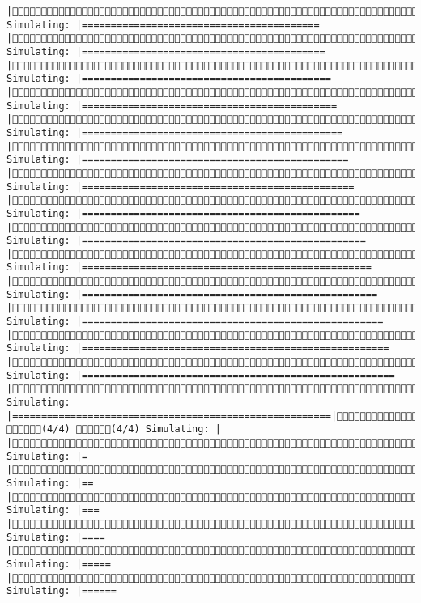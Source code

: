 \documentclass[]{article}
\begin{document}
\begin{verbatim}
|(3/4) Simulating: |=========================================              |(3/4) Simulating: |==========================================             |(3/4) Simulating: |===========================================            |(3/4) Simulating: |============================================           |(3/4) Simulating: |=============================================          |(3/4) Simulating: |==============================================         |(3/4) Simulating: |===============================================        |(3/4) Simulating: |================================================       |(3/4) Simulating: |=================================================      |(3/4) Simulating: |==================================================     |(3/4) Simulating: |===================================================    |(3/4) Simulating: |====================================================   |(3/4) Simulating: |=====================================================  |(3/4) Simulating: |====================================================== |(3/4) Simulating: |=======================================================|(3/4) (4/4) (4/4) Simulating: |                                                       |(4/4) Simulating: |=                                                      |(4/4) Simulating: |==                                                     |(4/4) Simulating: |===                                                    |(4/4) Simulating: |====                                                   |(4/4) Simulating: |=====                                                  |(4/4) Simulating: |======                                            
\end{verbatim}
\end{document}
